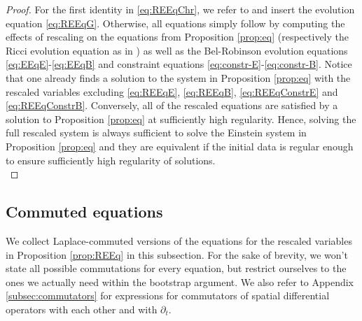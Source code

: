 \documentclass[11pt,leqno,textwidth=10cm]{amsart}
\numberwithin{equation}{section}
\theoremstyle{definition}
\theoremstyle{plain}
\newcommand{\1}{\mathbbm{1}}
\newcommand{\del}{\partial}
\begin{document}
\begin{proof}
For the first identity in \eqref{eq:REEqChr}, we refer to \cite[Lemma 2.27]{Chow06} and insert the evolution equation \eqref{eq:REEqG}. Otherwise, all equations simply follow by computing the effects of rescaling on the equations from Proposition \ref{prop:eq} (respectively the Ricci evolution equation as in \cite[Chapter 2.3, (2.32)]{Rendall08}) as well as the Bel-Robinson evolution equations \eqref{eq:EEqE}-\eqref{eq:EEqB} and constraint equations \eqref{eq:constr-E}-\eqref{eq:constr-B}. Notice that one already finds a solution to the system in Proposition \eqref{prop:eq} with the rescaled variables excluding \eqref{eq:REEqE}, \eqref{eq:REEqB}, \eqref{eq:REEqConstrE} and \eqref{eq:REEqConstrB}. Conversely, all of the rescaled equations are satisfied by a solution to Proposition \ref{prop:eq} at sufficiently high regularity. Hence, solving the full rescaled system is always sufficient to solve the Einstein system in Proposition \ref{prop:eq} and they are equivalent if the initial data is regular enough to ensure sufficiently high regularity of solutions.\\
\end{proof}

\subsection{Commuted equations}\label{subsec:comm-eq}

We collect Laplace-commuted versions of the equations for the rescaled variables in Proposition \ref{prop:REEq} in this subsection. For the sake of brevity, we won't state all possible commutations for every equation, but restrict ourselves to the ones we actually need within the bootstrap argument. We also refer to Appendix \ref{subsec:commutators} for expressions for commutators of spatial differential operators with each other and with $\del_t$.
\end{document}
